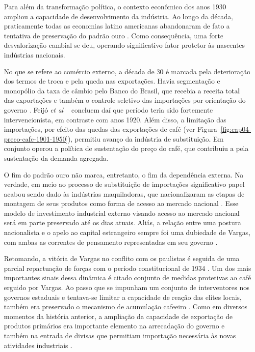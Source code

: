Para além da transformação política, o contexto econômico dos anos 1930
ampliou a capacidade de desenvolvimento da indústria. Ao longo da década, praticamente todas as
economias latino americanas abandonaram de fato a tentativa de
preservação do padrão ouro \citep{bethell_cambridge_2009,bethell_cambridge_2009-1}. Como consequência, uma
forte desvalorização cambial se deu, operando significativo fator
protetor às nascentes indústrias nacionais.

No que se refere ao comércio externo, a década de 30 é marcada pela
deterioração dos termos de troca e pela queda nas exportações. Havia
segmentação e monopólio da taxa de câmbio pelo Banco do Brasil, que
recebia a receita total das exportações e também o controle seletivo das
importações por orientação do governo \citep{feijo_industrializacao_2023}.
Feijó \emph{et al} ~\citeyearpar[]{feijo_industrializacao_2023}
concluem daí que período teria sido fortemente intervencionista, em contraste
com anos 1920. Além disso, a limitação das importações,
por efeito das quedas das exportações de café (ver Figura~\ref{fig:cap04-preco-cafe-1901-1950}), permitiu avanço da
indústria de substituição. Em conjunto operou a política de sustentação
do preço do café, que contribuiu a pela sustentação da demanda agregada.

O fim do padrão ouro não marca, entretanto, o fim da dependência
externa. Na verdade, em meio ao processo de substituição de importações
significativo papel acabou sendo dado às indústrias maquiladoras, que
nacionalizaram as etapas de montagem de seus produtos como forma de
acesso ao mercado nacional \citep{pradojunior2012}. Esse modelo de
investimento industrial externo visando acesso ao mercado nacional será em parte
preservado até os dias atuais. Aliás, a relação entre uma postura
nacionalista e o apelo ao capital estrangeiro sempre foi uma dubiedade
de Vargas, com ambas as correntes de pensamento representadas em seu
governo .


Retomando, a vitória de Vargas no conflito com os paulistas é seguida de uma parcial
repactuação de forças com o período constitucional de 1934 \citep[]{schwarcz_brasil_2015}.
Um dos mais importantes sinais dessa dinâmica é citado conjunto de medidas protetivas ao
café erguido por Vargas. Ao passo que se impunham um conjunto de
interventores nos governos estaduais e tentava-se limitar a capacidade
de reação das elites locais, também era preservado o mecanismo de
acumulação cafeeiro \citep[]{mello1982}. Como em diversos momentos da história
anterior, a ampliação da capacidade de exportação de produtos primários
era importante elemento na arrecadação do governo e também na entrada de
divisas que permitiam importação necessária às novas atividades
industriais \citep[]{mello1982,tavares1973}.

